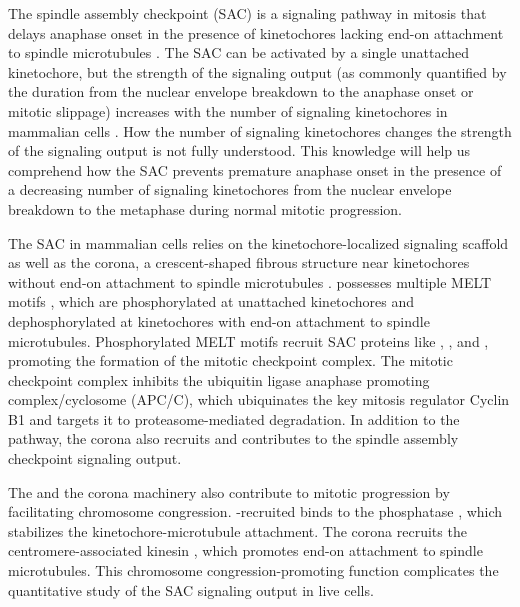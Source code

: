 
The spindle assembly checkpoint (SAC) is a signaling pathway in mitosis that delays anaphase onset in the presence of kinetochores lacking end-on attachment to spindle microtubules \cite{LateralAttachmentSAC}. The SAC can be activated by a single unattached kinetochore, but the strength of the signaling output (as commonly quantified by the duration from the nuclear envelope breakdown to the anaphase onset or mitotic slippage) increases with the number of signaling kinetochores in mammalian cells \cite{RiederNormalProgression,Rheostat,Ablation}. How the number of signaling kinetochores changes the strength of the signaling output is not fully understood. This knowledge will help us comprehend how the SAC prevents premature anaphase onset in the presence of a decreasing number of signaling kinetochores from the nuclear envelope breakdown to the metaphase during normal mitotic progression.

The SAC in mammalian cells relies on the kinetochore-localized signaling scaffold  as well as the corona, a crescent-shaped fibrous structure near kinetochores without end-on attachment to spindle microtubules \cite{GSK923295LateralAttachmentEM,CoronaActivatesSAC}.  possesses multiple MELT motifs \cite{MELTEvolution}, which are phosphorylated at unattached kinetochores and dephosphorylated at kinetochores with end-on attachment to spindle microtubules. Phosphorylated MELT motifs recruit SAC proteins like , , and , promoting the formation of the mitotic checkpoint complex. The mitotic checkpoint complex inhibits the ubiquitin ligase anaphase promoting complex/cyclosome (APC/C), which ubiquinates the key mitosis regulator Cyclin B1 and targets it to proteasome-mediated degradation. In addition to the  pathway, the corona also recruits  and contributes to the spindle assembly checkpoint signaling output.

The  and the corona machinery also contribute to mitotic progression by facilitating chromosome congression. -recruited  binds to the phosphatase , which stabilizes the kinetochore-microtubule attachment. The corona recruits the centromere-associated kinesin , which promotes end-on attachment to spindle microtubules. This chromosome congression-promoting function complicates the quantitative study of the SAC signaling output in live cells.

